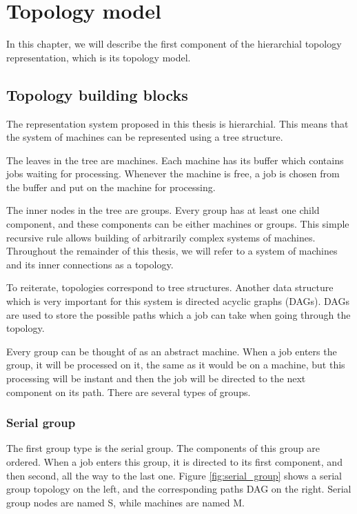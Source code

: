 \chapter{Topology model}
\label{sec:topology_model}

In this chapter, we will describe the first component of the hierarchial topology representation, which is its topology model.

\section{Topology building blocks}
\label{sec:topology_building_blocks}
The representation system proposed in this thesis is hierarchial. This means that the system of machines can be represented using a tree structure.

The leaves in the tree are machines. Each machine has its buffer which contains jobs waiting for processing. Whenever the machine is free, a job is chosen from the buffer and put on the machine for processing.

The inner nodes in the tree are groups. Every group has at least one child component, and these components can be either machines or groups. This simple recursive rule allows building of arbitrarily complex systems of machines. Throughout the remainder of this thesis, we will refer to a system of machines and its inner connections as a topology. 

To reiterate, topologies correspond to tree structures. Another data structure which is very important for this system is directed acyclic graphs (DAGs). DAGs are used to store the possible paths which a job can take when going through the topology.

Every group can be thought of as an abstract machine. When a job enters the group, it will be processed on it, the same as it would be on a machine, but this processing will be instant and then the job will be directed to the next component on its path. There are several types of groups. 

\subsection{Serial group}

The first group type is the serial group. The components of this group are ordered. When a job enters this group, it is directed to its first component, and then second, all the way to the last one. Figure \ref{fig:serial_group} shows a serial group topology on the left, and the corresponding paths DAG on the right. Serial group nodes are named S, while machines are named M.


